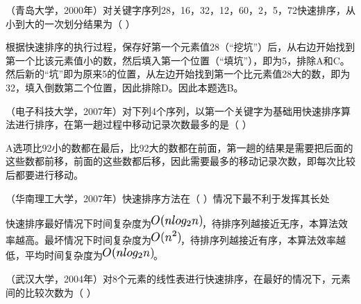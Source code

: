 \question （青岛大学，2000年）对关键字序列28，16，32，12，60，2，5，72快速排序，从小到大的一次划分结果为（
）
\par{}
\begin{solution}根据快速排序的执行过程，保存好第一个元素值28（``挖坑''）后，从右边开始找到第一个比该元素值小的数，然后填入第一个位置（``填坑''），即为5，排除A和C。然后新的``坑''即为原来5的位置，从左边开始找到第一个比元素值28大的数，即为32，填入倒数第二个位置，因此排除D。因此本题选B。
\end{solution}
\question （电子科技大学，2007年）对下列4个序列，以第一个关键字为基础用快速排序算法进行排序，在第一趟过程中移动记录次数最多的是（
）
\par{}
\begin{solution}A选项比92小的数都在最后，比92大的数都在前面，第一趟的结果是需要把后面的这些数都前移，前面的这些数都后移，因此需要最多的移动记录次数，即每次比较后都要进行移动。
\end{solution}
\question （华南理工大学，2007年）快速排序方法在（ ）情况下最不利于发挥其长处
\par{}
\begin{solution}快速排序最好情况下时间复杂度为\includegraphics[width=0.76042in,height=0.18750in]{texmath/3043595Cdpi7B3507DO28nlog_2n29}，待排序列越接近无序，本算法效率越高。最坏情况下时间复杂度为\includegraphics[width=0.43750in,height=0.19792in]{texmath/ead2f65Cdpi7B3507DO28n5E229}，待排序列越接近有序，本算法效率越低，平均时间复杂度为\includegraphics[width=0.76042in,height=0.18750in]{texmath/3043595Cdpi7B3507DO28nlog_2n29}。
\end{solution}
\question （武汉大学，2004年）对8个元素的线性表进行快速排序，在最好的情况下，元素间的比较次数为（
）
\par{}
